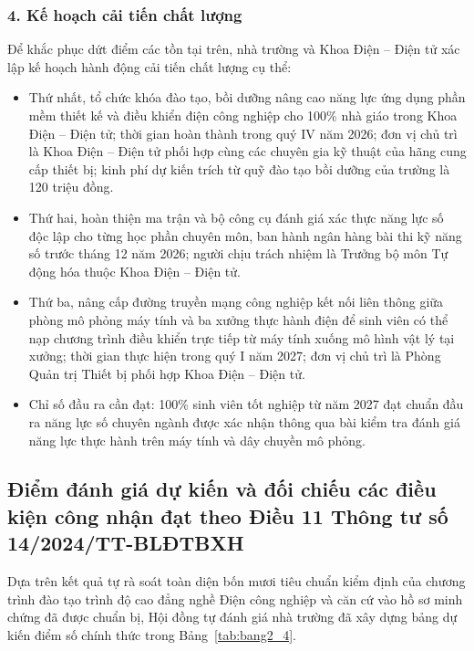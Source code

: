 \subsubsection*{4. Kế hoạch cải tiến chất lượng}
Để khắc phục dứt điểm các tồn tại trên, nhà trường và Khoa Điện -- Điện tử xác lập kế hoạch hành động cải tiến chất lượng cụ thể:
\begin{itemize}
    \item Thứ nhất, tổ chức khóa đào tạo, bồi dưỡng nâng cao năng lực ứng dụng phần mềm thiết kế và điều khiển điện công nghiệp cho 100\% nhà giáo trong Khoa Điện -- Điện tử; thời gian hoàn thành trong quý IV năm 2026; đơn vị chủ trì là Khoa Điện -- Điện tử phối hợp cùng các chuyên gia kỹ thuật của hãng cung cấp thiết bị; kinh phí dự kiến trích từ quỹ đào tạo bồi dưỡng của trường là 120 triệu đồng.
    \item Thứ hai, hoàn thiện ma trận và bộ công cụ đánh giá xác thực năng lực số độc lập cho từng học phần chuyên môn, ban hành ngân hàng bài thi kỹ năng số trước tháng 12 năm 2026; người chịu trách nhiệm là Trưởng bộ môn Tự động hóa thuộc Khoa Điện -- Điện tử.
    \item Thứ ba, nâng cấp đường truyền mạng công nghiệp kết nối liên thông giữa phòng mô phỏng máy tính và ba xưởng thực hành điện để sinh viên có thể nạp chương trình điều khiển trực tiếp từ máy tính xuống mô hình vật lý tại xưởng; thời gian thực hiện trong quý I năm 2027; đơn vị chủ trì là Phòng Quản trị Thiết bị phối hợp Khoa Điện -- Điện tử.
    \item Chỉ số đầu ra cần đạt: 100\% sinh viên tốt nghiệp từ năm 2027 đạt chuẩn đầu ra năng lực số chuyên ngành được xác nhận thông qua bài kiểm tra đánh giá năng lực thực hành trên máy tính và dây chuyền mô phỏng.
\end{itemize}

\subsection{Điểm đánh giá dự kiến và đối chiếu các điều kiện công nhận đạt theo Điều 11 Thông tư số 14/2024/TT-BLĐTBXH}

Dựa trên kết quả tự rà soát toàn diện bốn mươi tiêu chuẩn kiểm định của chương trình đào tạo trình độ cao đẳng nghề Điện công nghiệp và căn cứ vào hồ sơ minh chứng đã được chuẩn bị, Hội đồng tự đánh giá nhà trường đã xây dựng bảng dự kiến điểm số chính thức trong Bảng~\ref{tab:bang2_4}.

